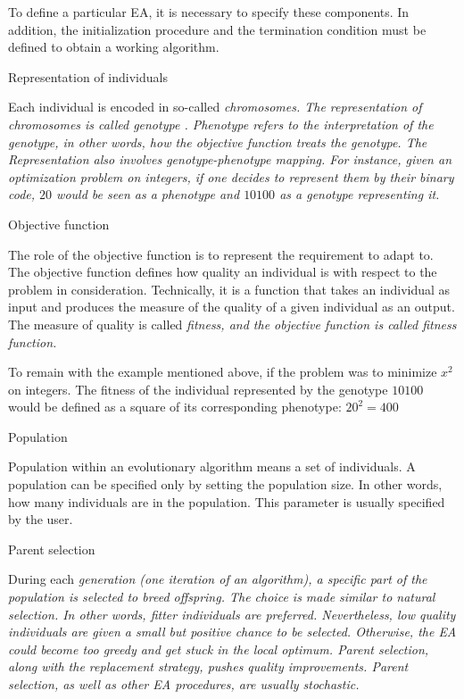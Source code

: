 To define a particular EA, it is necessary to specify these components. In addition,
the initialization procedure and the termination condition must be defined to obtain
a working algorithm.

\secc Representation of individuals

Each individual is encoded in so-called \em chromosomes\em. The representation of chromosomes is
called \em genotype \em. \em Phenotype \em refers to the interpretation of the genotype,
in other words, how the objective function treats the genotype. The Representation also involves
genotype-phenotype mapping. For instance, given an optimization problem on integers, if one
decides to represent them by their binary code, $20$ would be seen as a phenotype 
and $10100$ as a genotype representing it.

\secc Objective function

The role of the objective function is to represent the requirement to adapt to.
The objective function defines how quality an individual is with respect to the problem
in consideration. Technically, it is a function that takes an individual as input
and produces the measure of the quality of a given individual as an output. The measure of
quality is called \em fitness\em, and the objective function is called \em fitness
function\em.

To remain with the example mentioned above, if the problem was to minimize $x^2$ on
integers. The fitness of the individual represented by the genotype $10100$ would be
defined as a square of its corresponding phenotype: $20^2 = 400$

\secc Population

Population within an evolutionary algorithm means a set of individuals. A population can be
specified only by setting the population size. In other words, how many individuals
are in the population. This parameter is usually specified by the user.

\secc Parent selection

During each \em generation \em (one iteration of an algorithm), a specific part of the 
population is selected to breed offspring. 
The choice is made similar to natural selection. In other words, fitter individuals
are preferred. Nevertheless, low quality individuals are given a small but positive chance
to be selected. Otherwise, the EA could become too greedy and get stuck in the local optimum.
\em Parent selection\em, along with the replacement strategy, pushes quality improvements.
Parent selection, as well as other EA procedures, are usually stochastic.

